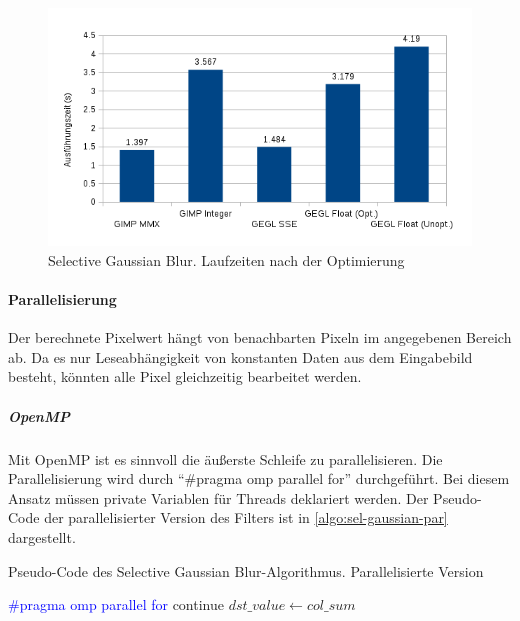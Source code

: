 \begin{figure}
\centering
\includegraphics[scale=0.75]{graphs/sgb-graph-2.png}
\caption{Selective Gaussian Blur. Laufzeiten nach der Optimierung}
\label{fig:sgb-graph-2}
\end{figure} 
 

\paragraph{Parallelisierung} 
Der berechnete Pixelwert hängt von benachbarten Pixeln im angegebenen Bereich ab. Da es nur Leseabhängigkeit von konstanten Daten aus dem Eingabebild besteht, könnten alle Pixel gleichzeitig bearbeitet werden.

\subparagraph{OpenMP}
Mit OpenMP ist es sinnvoll die äußerste Schleife zu parallelisieren. Die Parallelisierung wird durch ``\#pragma omp parallel for'' durchgeführt.  Bei diesem Ansatz müssen private Variablen für Threads deklariert werden. Der Pseudo-Code der parallelisierter Version des Filters ist in \autoref{algo:sel-gaussian-par} dargestellt.

\begin{algorithm}[h]
\caption{Pseudo-Code des \glqq Selective Gaussian Blur\grqq-Algorithmus. Parallelisierte Version}
\label{algo:sel-gaussian-par}
\begin{algorithmic}[1]
\State \textcolor{blue}{\#pragma omp parallel for }
			\State continue
			\EndIf
				\EndIf
			\EndFor
		\EndFor
		\State $dst\_value \gets col\_sum$
	\EndFor
\EndFor	
\end{algorithmic}
\end{algorithm}

